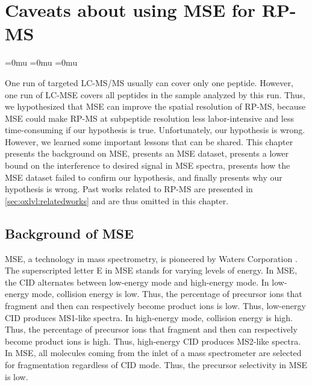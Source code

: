 
\glsunsetall
\chapter{Caveats about using \texorpdfstring{\gls{MSE}}{MSE} for \texorpdfstring{\gls{RP-MS}}{RP-MS}}
\label{chap:MSE}
\glsresetall

\begingroup
\thinmuskip=0mu
\medmuskip=0mu
\thickmuskip=0mu

One run of targeted \gls{LC-MS/MS} usually can cover only one peptide.
However, one run of LC-\gls{MSE} covers all peptides in the sample analyzed by this run.
Thus, we hypothesized that \gls{MSE} can improve the spatial resolution of \gls{RP-MS},
		because \gls{MSE} could make \gls{RP-MS} at subpeptide resolution less labor-intensive and less time-consuming if our hypothesis is true.{}
Unfortunately, our hypothesis is wrong.
However, we learned some important lessons that can be shared.
This chapter
		presents the background on \gls{MSE},
		presents an \gls{MSE} dataset,
		presents a lower bound on the interference to desired signal in \gls{MSE} spectra,
		presents how the \gls{MSE} dataset failed to confirm our hypothesis,
		and finally presents why our hypothesis is wrong.
Past works related to \gls{RP-MS} are presented in \cref{sec:oxlvl:relatedworks} and are thus omitted in this chapter.

\section{Background of \texorpdfstring{\gls{MSE}}{MSE}}

\Gls{MSE}, a technology in mass spectrometry, is pioneered by Waters Corporation \cite{plumb2006uplc}.
The superscripted letter E in \gls{MSE} stands for varying levels of energy.
In \gls{MSE}, the \gls{CID} alternates between low-energy mode and high-energy mode.
In low-energy mode, collision energy is low. 
Thus, the percentage of precursor ions that fragment and then can respectively become product ions is low. 
Thus, low-energy \gls{CID} produces \gls{MS1}-like spectra.
In high-energy mode, collision energy is high.
Thus, the percentage of precursor ions that fragment and then can respectively become product ions is high. 
Thus, high-energy \gls{CID} produces \gls{MS2}-like spectra.
In \gls{MSE}, all molecules coming from the inlet of a mass spectrometer are selected for fragmentation regardless of \gls{CID} mode.
Thus, the precursor selectivity in \gls{MSE} is low.

